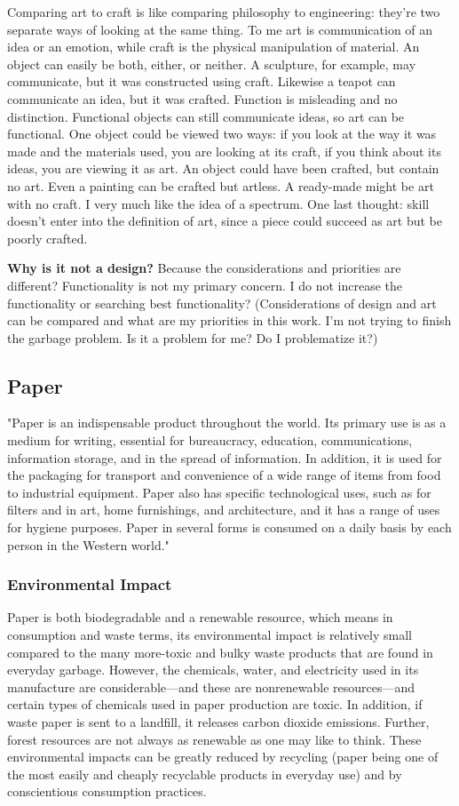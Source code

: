 Comparing art to craft is like comparing philosophy to engineering: they're two separate ways of looking at the same thing. To me art is communication of an idea or an emotion, while craft is the physical manipulation of material. An object can easily be both, either, or neither. A sculpture, for example, may communicate, but it was constructed using craft. Likewise a teapot can communicate an idea, but it was crafted. Function is misleading and no distinction. Functional objects can still communicate ideas, so art can be functional. One object could be viewed two ways: if you look at the way it was made and the materials used, you are looking at its craft, if you think about its ideas, you are viewing it as art. An object could have been crafted, but contain no art. Even a painting can be crafted but artless. A ready-made might be art with no craft. I very much like the idea of a spectrum. One last thought: skill doesn't enter into the definition of art, since a piece could succeed as art but be poorly crafted.

\textbf{Why is it not a design?} Because the considerations and priorities are different? Functionality is not my primary concern. I do not increase the functionality or searching best functionality? (Considerations of design and art can be compared and what are my priorities in this work. I'm not trying to finish the garbage problem. Is it a problem for me? Do I problematize it?) 

\subsection{Paper}
"Paper is an indispensable product throughout the world. Its primary use is as a medium for writing, essential for bureaucracy, education, communications, information storage, and in the spread of information. In addition, it is used for the packaging for transport and convenience of a wide range of items from food to industrial equipment. Paper also has specific technological uses, such as for filters and in art, home furnishings, and architecture, and it has a range of uses for hygiene purposes. Paper in several forms is consumed on a daily basis by each person in the Western world." \cite{trafford2012paper}

%
\subsubsection{Environmental Impact}
Paper is both biodegradable and a renewable resource, which means in consumption and waste terms, its environmental impact is relatively small compared to the many more-toxic and bulky waste products that are found in everyday garbage. However, the chemicals, water, and electricity used in its manufacture are considerable---and these are nonrenewable resources---and certain types of chemicals used in paper production are toxic. In addition, if waste paper is sent to a landfill, it releases carbon dioxide emissions. Further, forest resources are not always as renewable as one may like to think. These environmental impacts can be greatly reduced by recycling (paper being one of the most easily and cheaply recyclable products in everyday use) and by conscientious consumption practices.

